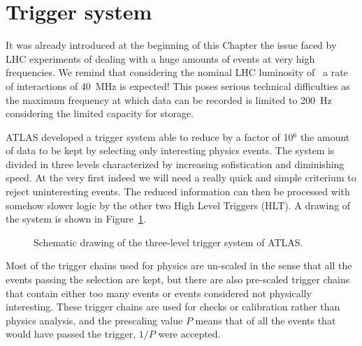 \section{Trigger system}\label{sec:trigger}

It was already introduced at the beginning of this Chapter the issue
faced by LHC experiments of dealing with a huge amounts of events
at very high frequencies. We remind that considering the nominal LHC
luminosity of \highL\ a rate of interactions of 40~MHz is expected!
This poses serious technical difficulties as the maximum frequency
at which data can be recorded is limited to 200~Hz considering the
limited capacity for storage.

ATLAS developed a trigger system able to reduce by a factor of 10$^6$
the amount of data to be kept by selecting only interesting physics events.
The system is divided in three levels characterized by increasing sofistication
and diminishing speed. At the very first indeed we will need a really quick and
simple criterium to reject uninteresting events. The reduced information can then be
processed with somehow slower logic by the other two High Level Triggers (HLT).
A drawing of the system is shown in Figure~\ref{fig:trigger}.

\begin{figure}[tb]\begin{center}
	\caption{Schematic drawing of the three-level trigger system of ATLAS.\label{fig:trigger}}
\end{center}\end{figure}

Most of the trigger chains used for physics are un-scaled in the
sense that all the events passing the selection are kept, but there
are also pre-scaled trigger chains that contain either too many events
or events considered not physically interesting. These trigger chains
are used for checks or calibration rather than physics analysis, and the
prescaling value $P$ means that of all the events that would have passed 
the trigger, $1/P$ were accepted.

